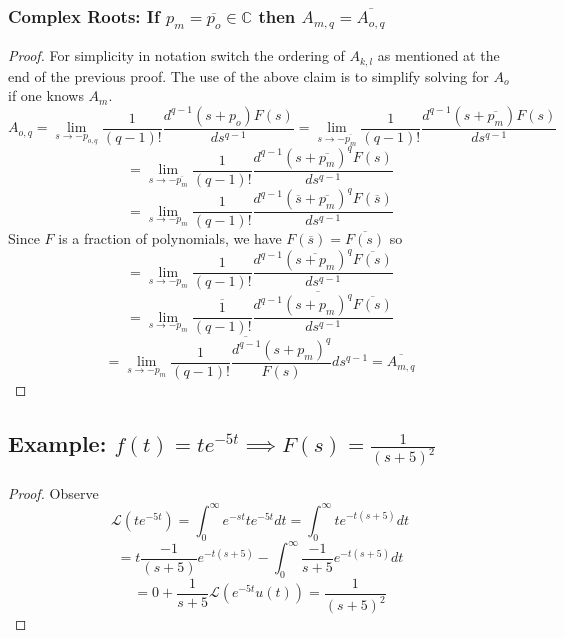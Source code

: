 \documentclass[11pt]{article}
\newcommand{\comps}{\mathbb{C}}
\begin{document}
\subsubsection{Complex Roots: If $p_m = \overline{p_o} \in \comps$ then $A_{m, q} = \overline{A_{o, q}}$}
\begin{proof}
	For simplicity in notation switch the ordering of $A_{k, l}$ as mentioned at the end of the previous proof. The use of the above claim is to simplify solving for $A_{o}$ if one knows $A_{m}$. 
	\[A_{o, q} = \lim_{s \to - p_{o, q}} \frac{1}{(q - 1)!}\frac{d^{q - 1}(s + p_o)F(s)}{ds^{q - 1}}= \lim_{s \to -\overline{p_m}} \frac{1}{(q - 1)!}\frac{d^{q - 1}(s + \overline{p_m})F(s)}{ds^{q - 1}}\]
	\[= \lim_{s \to -\overline{p_m}} \frac{1}{(q - 1)!}\frac{d^{q - 1}(s + \overline{p_m})^qF(s)}{ds^{q - 1}}\]
	\[= \lim_{s \to -p_m} \frac{1}{(q - 1)!}\frac{d^{q - 1}(\overline{s} + \overline{p_m})^qF(\overline{s})}{ds^{q - 1}}\]
	Since $F$ is a fraction of polynomials, we have $F(\overline{s}) = \overline{F(s)}$ so 
	\[= \lim_{s \to -p_m} \frac{1}{(q - 1)!}\frac{d^{q - 1}(\overline{s + p_m})^q\overline{F(s)}}{ds^{q - 1}}\]
	\[= \lim_{s \to -p_m} \overline{\frac{1}{(q - 1)!}}\frac{d^{q - 1}\overline{(s + p_m)^q}\overline{F(s)}}{ds^{q - 1}}\]
	\[= \overline{ \lim_{s \to -p_m} \frac{1}{(q - 1)!}\frac{d^{q - 1}(s + p_m)^q}{F(s)}{ds^{q - 1}}} = \overline{A_{m, q}}\]
\end{proof} 

\subsection{Example: $f(t) = te^{-5t} \implies F(s) = \frac{1}{(s + 5)^2}$}
\begin{proof}
	Observe 
	\[\mathcal{L}(te^{-5t}) = \int_0^{\infty} e^{-st} te^{-5t} dt =  \int_0^{\infty} te^{-t(s + 5)} dt\]
	\[= t \frac{-1}{(s + 5)} e^{-t(s + 5)} -  \int_0^{\infty}  \frac{-1}{s + 5} e^{-t(s + 5)} dt\]
	\[= 0 + \frac{1}{s + 5} \mathcal{L}(e^{-5t}u(t)) = \frac{1}{( s + 5)^2}\]
\end{proof}
\end{document}
